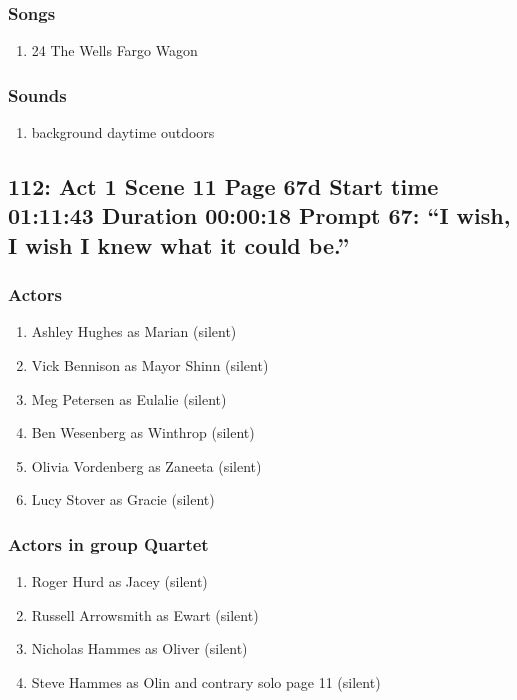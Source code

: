 \subsubsection{Songs}
\begin{enumerate}
\item 24 The Wells Fargo Wagon
\end{enumerate}\subsubsection{Sounds}
\begin{enumerate}
\item background daytime outdoors
\end{enumerate}
\subsection{112: Act 1 Scene 11 Page 67d Start time 01:11:43 Duration 00:00:18 Prompt 67: ``I wish, I wish I knew what it could be.''}

\subsubsection{Actors}
\begin{enumerate}
\item Ashley Hughes as Marian (silent)
\item Vick Bennison as Mayor Shinn (silent)
\item Meg Petersen as Eulalie (silent)
\item Ben Wesenberg as Winthrop (silent)
\item Olivia Vordenberg as Zaneeta (silent)
\item Lucy Stover as Gracie (silent)
\end{enumerate}
\subsubsection{Actors in group Quartet}
\begin{enumerate}
\item Roger Hurd as Jacey (silent)
\item Russell Arrowsmith as Ewart (silent)
\item Nicholas Hammes as Oliver (silent)
\item Steve Hammes as Olin and contrary solo page 11 (silent)
\end{enumerate}
